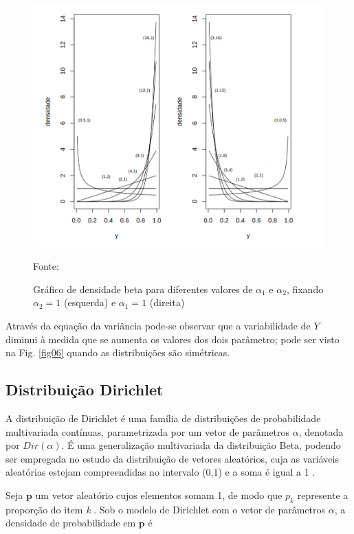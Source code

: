 \begin{figure}[!h]
	\centering
	\includegraphics[keepaspectratio=true,scale=0.4]{figuras/dist-beta2.png}
	\caption{Gráfico de densidade beta para diferentes valores de $\alpha_1$ e $\alpha_2$, fixando $\alpha_2 = 1$ (esquerda) e $\alpha_1 = 1$ (direita)}
	Fonte: \cite{gomes2005}
	\label{fig07}
\end{figure}


Através da equação da variância pode-se observar que a variabilidade de $Y$ diminui à medida que se aumenta os valores dos dois parâmetro; pode ser visto na Fig. \ref{fig06} quando as distribuições são simétricas.


\subsection{Distribuição Dirichlet}


A distribuição de Dirichlet é uma família de distribuições de probabilidade multivariada contínuas, parametrizada por um vetor de parâmetros $\alpha$, denotada por $Dir(\alpha)$. É uma generalização multivariada da distribuição Beta, podendo ser empregada no estudo da distribuição de vetores aleatórios, cuja as variáveis aleatórias estejam compreendidas no intervalo (0,1) e a soma é igual a 1 .

Seja $\textbf{p}$ um vetor aleatório cujos elementos somam 1, de modo que $p_{k}$ represente a proporção do item \textit{k} \cite{minka2000}. Sob o modelo de Dirichlet com o vetor de parâmetros $\alpha$, a densidade de probabilidade em $\textbf{p}$ é

